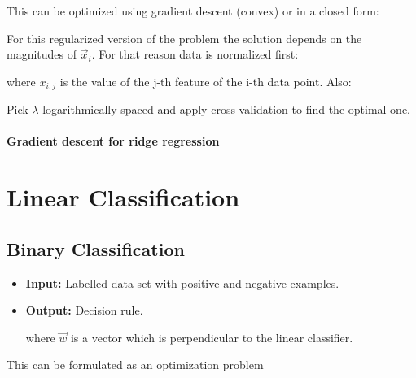 \documentclass[10pt,a4paper]{scrartcl}
\begin{document}
\begin{multicols*}{2}
This can be optimized using gradient descent (convex) or in a closed form:


For this regularized version of the problem the solution depends on the magnitudes of $\vec{x}_i$. For that reason data is normalized first:


where $x_{i,j}$ is the value of the j-th feature of the i-th data point. Also:


Pick $\lambda$ logarithmically spaced and apply cross-validation to find the optimal one.

\paragraph{Gradient descent for ridge regression}


\section{Linear Classification}

\subsection{Binary Classification}

\begin{itemize}
\item \textbf{Input:} Labelled data set with positive and negative examples.

\item \textbf{Output:} Decision rule.



where $\vec{w}$ is a vector which is perpendicular to the linear classifier.
\end{itemize}

This can be formulated as an optimization problem


\end{multicols*}
\end{document}
